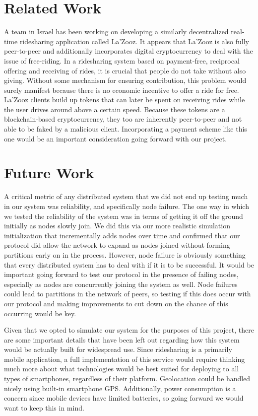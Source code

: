\documentclass[letterpaper,11pt,twocolumn]{article}
\begin{document}
\section{Related Work}
A team in Israel has been working on developing a similarly decentralized real-time ridesharing application called La'Zooz. It appears that La'Zooz is also fully peer-to-peer and additionally incorporates digital cryptocurrency to deal with the issue of free-riding. In a ridesharing system based on payment-free, reciprocal offering and receiving of rides, it is crucial that people do not take without also giving. Without some mechanism for ensuring contribution, this problem would surely manifest because there is no economic incentive to offer a ride for free. La'Zooz clients build up tokens that can later be spent on receiving rides while the user drives around above a certain speed. Because these tokens are a blockchain-based cryptocurrency, they too are inherently peer-to-peer and not able to be faked by a malicious client. Incorporating a payment scheme like this one would be an important consideration going forward with our project.

\section{Future Work}
A critical metric of any distributed system that we did not end up testing much in our system was reliability, and specifically node failure. The one way in which we tested the reliability of the system was in terms of getting it off the ground initially as nodes slowly join. We did this via our more realistic simulation initialization that incrementally adds nodes over time and confirmed that our protocol did allow the network to expand as nodes joined without forming partitions early on in the process. However, node failure is obviously something that every distributed system has to deal with if it is to be successful. It would be important going forward to test our protocol in the presence of failing nodes, especially as nodes are concurrently joining the system as well. Node failures could lead to partitions in the network of peers, so testing if this does occur with our protocol and making improvements to cut down on the chance of this occurring would be key.
                    
Given that we opted to simulate our system for the purposes of this project, there are some important details that have been left out regarding how this system would be actually built for widespread use. Since ridesharing is a primarily mobile application, a full implementation of this service would require thinking much more about what technologies would be best suited for deploying to all types of smartphones, regardless of their platform. Geolocation could be handled nicely using built-in smartphone GPS. Additionally, power consumption is a concern since mobile devices have limited batteries, so going forward we would want to keep this in mind. 
\end{document}
